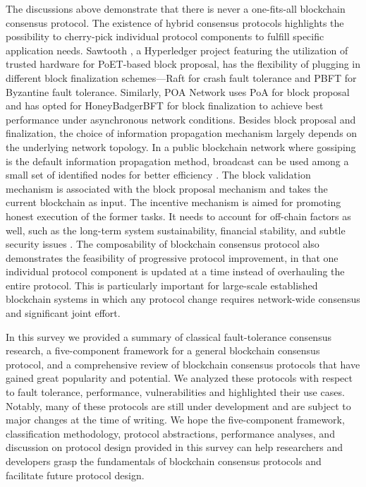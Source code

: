 The discussions above demonstrate that there is never a one-fits-all blockchain consensus protocol. The existence of hybrid consensus protocols highlights the possibility to cherry-pick individual protocol components to fulfill specific application needs.
Sawtooth , a Hyperledger project featuring the utilization of trusted hardware for PoET-based block proposal, has the flexibility of plugging in different block finalization schemes---Raft for crash fault tolerance and PBFT for Byzantine fault tolerance. Similarly, POA Network  uses PoA for block proposal and has opted for HoneyBadgerBFT for block finalization to achieve best performance under asynchronous network conditions. 
Besides block proposal and finalization, the choice of information propagation mechanism largely depends on the underlying network topology. In a public blockchain network where gossiping is the default information propagation method, broadcast can be used among a small set of identified nodes for better efficiency .
The block validation mechanism is associated with the block proposal mechanism and takes the current blockchain as input. The incentive mechanism is aimed for promoting honest execution of the former tasks. It needs to account for off-chain factors as well, such as the long-term system sustainability, financial stability, and subtle security issues . 
The composability of blockchain consensus protocol also demonstrates the feasibility of progressive protocol improvement, in that one individual protocol component is updated at a time instead of overhauling the entire protocol. 
This is particularly important for large-scale established blockchain systems in which any protocol change requires network-wide consensus and significant joint effort.

\label{sec:conclude}
In this survey we provided a summary of classical fault-tolerance consensus research, a five-component framework for a general blockchain consensus protocol, and a comprehensive review of blockchain consensus protocols that
have gained great popularity and potential.
We analyzed these protocols with respect to fault tolerance, performance, vulnerabilities and highlighted their use cases. Notably, many of these protocols are still under development and are subject to major changes at the time of writing.
We hope the five-component framework, classification methodology, protocol abstractions, {\color{\rcolor}performance analyses, and discussion on protocol design} provided in this survey can help researchers and developers grasp the fundamentals of blockchain consensus protocols and facilitate future protocol design.
